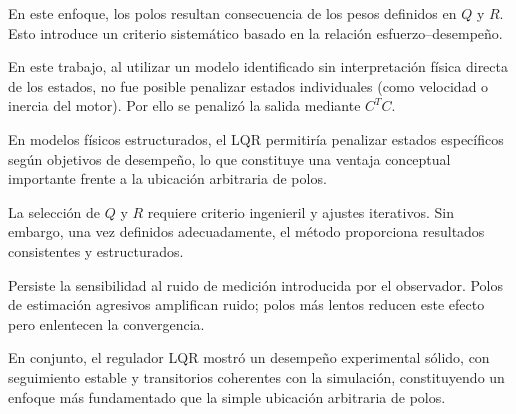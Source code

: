 En este enfoque, los polos resultan consecuencia de los pesos definidos
en \(Q\) y \(R\). Esto introduce un criterio sistemático basado en la
relación esfuerzo–desempeño.

En este trabajo, al utilizar un modelo identificado sin interpretación
física directa de los estados, no fue posible penalizar estados
individuales (como velocidad o inercia del motor). Por ello se penalizó la
salida mediante \(C^TC\).

En modelos físicos estructurados, el LQR permitiría penalizar estados
específicos según objetivos de desempeño, lo que constituye una ventaja
conceptual importante frente a la ubicación arbitraria de polos.

La selección de \(Q\) y \(R\) requiere criterio ingenieril y ajustes
iterativos. Sin embargo, una vez definidos adecuadamente, el método
proporciona resultados consistentes y estructurados.

Persiste la sensibilidad al ruido de medición introducida por el
observador. Polos de estimación agresivos amplifican ruido; polos
más lentos reducen este efecto pero enlentecen la convergencia.

En conjunto, el regulador LQR mostró un desempeño experimental sólido,
con seguimiento estable y transitorios coherentes con la simulación,
constituyendo un enfoque más fundamentado que la simple ubicación
arbitraria de polos.
